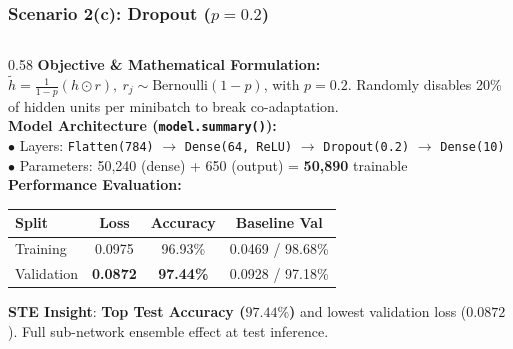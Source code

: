 {
\usebackgroundtemplate{\backgroundcontent}
\begin{frame}
    \frametitle{Scenario 2(c): Dropout ($p = 0.2$)}
    \vspace{-0.30cm}
    \begin{columns}[T]
        \begin{column}{0.58\textwidth}
            \textbf{\scriptsize Objective \& Mathematical Formulation:}\\[1pt]
            {\scriptsize $\tilde{h} = \frac{1}{1-p}(h \odot r), \ r_j \sim \text{Bernoulli}(1-p)$, with $p = 0.2$. Randomly disables 20\% of hidden units per minibatch to break co-adaptation.}\\[3pt]
            
            \textbf{\scriptsize Model Architecture (\texttt{model.summary()}):}\\[1pt]
            {\scriptsize
            $\bullet$ Layers: \texttt{Flatten(784)} $\to$ \texttt{Dense(64, ReLU)} $\to$ \texttt{Dropout(0.2)} $\to$ \texttt{Dense(10)}\\
            $\bullet$ Parameters: 50,240 (dense) + 650 (output) = \textbf{50,890} trainable
            }\\[3pt]
            
            \textbf{\scriptsize Performance Evaluation:}\\[1pt]
            {\scriptsize
            \setlength{\tabcolsep}{3pt}
            \renewcommand{\arraystretch}{0.90}
            \begin{tabular}{lccc}
                \toprule
                \textbf{Split} & \textbf{Loss} & \textbf{Accuracy} & \textbf{Baseline Val} \\
                \midrule
                Training & 0.0975 & 96.93\% & 0.0469 / 98.68\% \\
                Validation & \textbf{0.0872} & \textbf{97.44\%} & 0.0928 / 97.18\% \\
                \bottomrule
            \end{tabular}
            \par\vspace{2pt}
            \textbf{STE Insight}: \textbf{Top Test Accuracy ($97.44\%$)} and lowest validation loss ($0.0872$). Full sub-network ensemble effect at test inference.\par
            }
        \end{column}
        

\end{columns}
\end{frame}}

